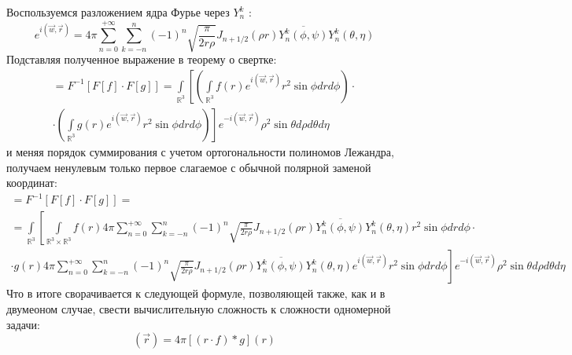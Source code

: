 Воспользуемся разложением ядра Фурье через $ Y_{n}^{k} $ \cite{Baddour:10}: \begin{equation*}
e^{i(\vec{w},\vec{r})}=4\pi\sum\limits _{n=0}^{+\infty}\sum\limits _{k=-n}^{n}(-1)^{n}\sqrt{\frac{\pi}{2r\rho}}J_{n+1/2}(\rho r)\overline{Y_{n}^{k}(\phi,\psi)}Y_{n}^{k}(\theta,\eta)
\end{equation*}
Подставляя полученное выражение в теорему о свертке:
\begin{multline*}
[f***g]=F^{-1}[ F[f]\cdot F[g] ]= \int\limits_{\mathbb{R}^3} \left[ \left( \int\limits_{\mathbb{R}^3} f(r) e^{i (\vec{w}, \vec{r})} r^2 \sin \phi dr d\phi \right) \cdot \right. \\
\left. \cdot \left( \int\limits_{\mathbb{R}^3} g(r) e^{i (\vec{w}, \vec{r})} r^2 \sin \phi dr d\phi \right) \right] e^{-i (\vec{w}, \vec{r})} \rho^2 \sin \theta d\rho d\theta d\eta
\end{multline*}
и меняя порядок суммирования с учетом ортогональности полиномов Лежандра, получаем ненулевым только первое слагаемое с обычной полярной заменой координат: 
\begin{multline*}
[f***g]=F^{-1}[ F[f]\cdot F[g] ]=\\
= \int\limits_{\mathbb{R}^3} \left[  \int\limits_{\mathbb{R}^3 \times \mathbb{R}^3} f(r) 4\pi\sum\limits _{n=0}^{+\infty}\sum\limits _{k=-n}^{n}(-1)^{n}\sqrt{\frac{\pi}{2r\rho}}J_{n+1/2}(\rho r)\overline{Y_{n}^{k}(\phi,\psi)}Y_{n}^{k}(\theta,\eta) r^2 \sin \phi dr d\phi \right. \cdot \\ \cdot \left. g(r) 4\pi\sum\limits _{n=0}^{+\infty}\sum\limits _{k=-n}^{n}(-1)^{n}\sqrt{\frac{\pi}{2r\rho}}J_{n+1/2}(\rho r)\overline{Y_{n}^{k}(\phi,\psi)}Y_{n}^{k}(\theta,\eta)e^{i (\vec{w}, \vec{r})} r^2 \sin \phi dr d\phi \right] e^{-i (\vec{w}, \vec{r})} \rho^2 \sin \theta d\rho d\theta d\eta
\end{multline*}
Что в итоге сворачивается к следующей формуле, позволяющей также, как и в двумеоном случае, свести вычислительную сложность к сложности одномерной задачи:
\begin{equation*}
[f***g](\vec{r})=4\pi[(r\cdot f)*g](r)
\end{equation*}
